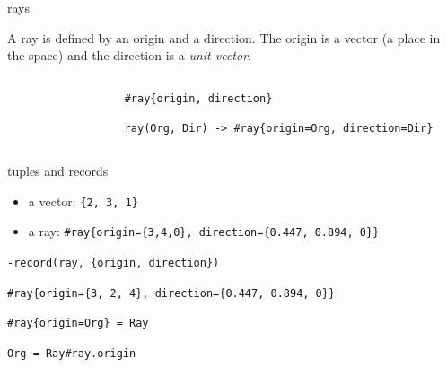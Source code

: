 \begin{frame}[fragile]{rays}

  A ray is defined by an origin and a direction. The origin is a
  vector (a place in the space) and the direction is a {\em unit
    vector}.

\pause 

\begin{columns}[T]
 \begin{column}{0.3\linewidth}
  \begin{figure}
  \end{figure}  
  \end{column}

\pause

\begin{column}{0.7\linewidth}

\begin{verbatim}
#ray{origin, direction}
\end{verbatim}


\begin{verbatim}
ray(Org, Dir) -> #ray{origin=Org, direction=Dir}
\end{verbatim}

  \end{column}
 \end{columns}
\end{frame}

\begin{frame}[fragile]{tuples and records}

 \begin{itemize}
  \item a vector: {\tt \{2, 3, 1\}}
  \item a ray:  {\tt \#ray\{origin=\{3,4,0\}, direction=\{0.447, 0.894, 0\}\}}
 \end{itemize}

\pause\vspace{20pt}

\verb+-record(ray, {origin, direction})+

\pause \vspace{10pt}
\verb+#ray{origin={3, 2, 4}, direction={0.447, 0.894, 0}}+

\pause \vspace{10pt}
\verb+#ray{origin=Org} = Ray+

\pause \vspace{10pt}
\verb+Org = Ray#ray.origin+

\end{frame}


